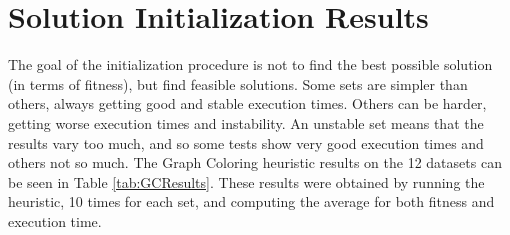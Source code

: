\section{Solution Initialization Results}
\label{sec:SolutionInitResults}
The goal of the initialization procedure is not to find the best possible solution (in terms of fitness), but find feasible solutions. Some sets are simpler than others, always getting good and stable execution times. Others can be harder, getting worse execution times and instability. An unstable set means that the results vary too much, and so some tests show very good execution times and others not so much. The Graph Coloring heuristic results on the 12 datasets can be seen in Table \ref{tab:GCResults}. These results were obtained by running the heuristic, 10 times for each set, and computing the average for both fitness and execution time.\\
\\
